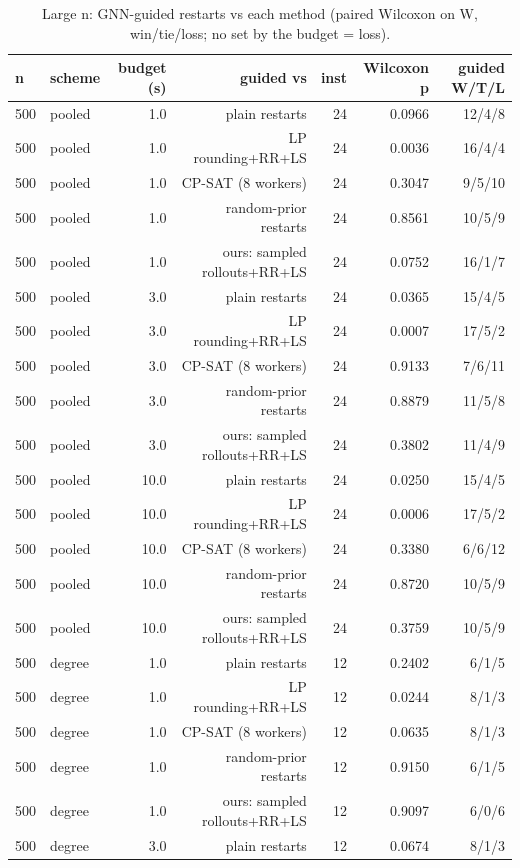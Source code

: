 \begin{table}[t]
\centering
\caption{Large n: GNN-guided restarts vs each method (paired Wilcoxon on W, win/tie/loss; no set by the budget = loss).}
\label{tab:rev2_step2_tests}
\scriptsize
\begin{tabular}{llrrrrr}
\toprule
n & scheme & budget (s) & guided vs & inst & Wilcoxon p & guided W/T/L \\
\midrule
500 & pooled & 1.0 & plain restarts & 24 & 0.0966 & 12/4/8 \\
500 & pooled & 1.0 & LP rounding+RR+LS & 24 & 0.0036 & 16/4/4 \\
500 & pooled & 1.0 & CP-SAT (8 workers) & 24 & 0.3047 & 9/5/10 \\
500 & pooled & 1.0 & random-prior restarts & 24 & 0.8561 & 10/5/9 \\
500 & pooled & 1.0 & ours: sampled rollouts+RR+LS & 24 & 0.0752 & 16/1/7 \\
500 & pooled & 3.0 & plain restarts & 24 & 0.0365 & 15/4/5 \\
500 & pooled & 3.0 & LP rounding+RR+LS & 24 & 0.0007 & 17/5/2 \\
500 & pooled & 3.0 & CP-SAT (8 workers) & 24 & 0.9133 & 7/6/11 \\
500 & pooled & 3.0 & random-prior restarts & 24 & 0.8879 & 11/5/8 \\
500 & pooled & 3.0 & ours: sampled rollouts+RR+LS & 24 & 0.3802 & 11/4/9 \\
500 & pooled & 10.0 & plain restarts & 24 & 0.0250 & 15/4/5 \\
500 & pooled & 10.0 & LP rounding+RR+LS & 24 & 0.0006 & 17/5/2 \\
500 & pooled & 10.0 & CP-SAT (8 workers) & 24 & 0.3380 & 6/6/12 \\
500 & pooled & 10.0 & random-prior restarts & 24 & 0.8720 & 10/5/9 \\
500 & pooled & 10.0 & ours: sampled rollouts+RR+LS & 24 & 0.3759 & 10/5/9 \\
500 & degree & 1.0 & plain restarts & 12 & 0.2402 & 6/1/5 \\
500 & degree & 1.0 & LP rounding+RR+LS & 12 & 0.0244 & 8/1/3 \\
500 & degree & 1.0 & CP-SAT (8 workers) & 12 & 0.0635 & 8/1/3 \\
500 & degree & 1.0 & random-prior restarts & 12 & 0.9150 & 6/1/5 \\
500 & degree & 1.0 & ours: sampled rollouts+RR+LS & 12 & 0.9097 & 6/0/6 \\
500 & degree & 3.0 & plain restarts & 12 & 0.0674 & 8/1/3 \\

\end{tabular}
\end{table}
